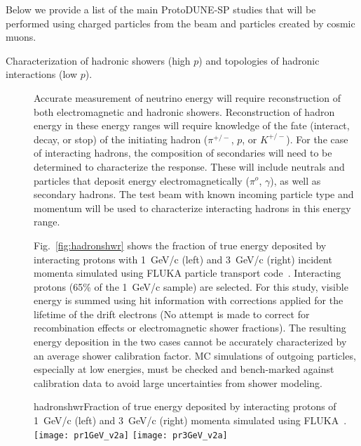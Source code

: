 Below  we provide a list of the main ProtoDUNE-SP studies that will be performed using charged particles from the beam and particles created by cosmic muons.
\begin{description}
\item [Characterization of hadronic showers (high $p$) and topologies of hadronic interactions (low $p$).]


Accurate measurement of neutrino energy will require reconstruction of both electromagnetic and hadronic showers. Reconstruction of hadron energy 
in these energy ranges will require knowledge of the fate (interact, decay, or stop) of the initiating hadron ($\pi^{+/-}$, $p$, or $K^{+/-}$).
For the case of  interacting hadrons, the composition of secondaries
will need to be determined to characterize the response. 
These will include neutrals and particles that 
deposit energy electromagnetically ($\pi^o$, $\gamma$), as well as
secondary hadrons. The test beam with known incoming particle type and momentum will be used
to characterize interacting hadrons in this energy range.


Fig.~\ref{fig:hadronshwr} shows the fraction of true energy deposited by interacting protons with 1~GeV/c (left) and
3~GeV/c (right) incident momenta simulated using FLUKA particle transport code~\cite{fluka05}. 
Interacting protons (65\% of the 1~GeV/c sample) are selected.
For this study, visible energy is summed using hit information with corrections applied for the lifetime of 
the drift electrons (No attempt is made to correct for recombination effects or electromagnetic shower fractions). 
The resulting energy deposition in the two cases cannot be 
accurately characterized by an average shower calibration factor. MC simulations of 
outgoing particles, especially at low energies, must be checked and bench-marked against calibration data to avoid
large uncertainties from shower modeling. 

\begin{cdrfigure}{hadronshwr}{Fraction of true energy deposited by interacting protons of 1~GeV/c (left) and
3~GeV/c (right) momenta simulated using FLUKA~\cite{fluka05}.}
\texttt{[image: pr1GeV\_v2a]}
\texttt{[image: pr3GeV\_v2a]}
\end{cdrfigure}



\end{description}
